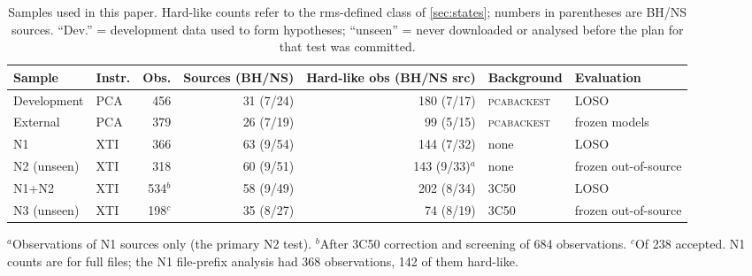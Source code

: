 \documentclass[11pt,a4paper]{article}
\begin{document}
\begin{table}[t]
\centering\small
\caption{Samples used in this paper. Hard-like counts refer to the rms-defined class of \cref{sec:states}; numbers in
parentheses are BH/NS sources. ``Dev.'' = development data used to form hypotheses; ``unseen'' = never downloaded or
analysed before the plan for that test was committed.}\label{tab:samples}
\footnotesize\setlength{\tabcolsep}{4pt}
\begin{tabular}{@{}l l r r r l l@{}}
\toprule
Sample & Instr. & Obs. & Sources (BH/NS) & Hard-like obs (BH/NS src) & Background & Evaluation \\
\midrule
Development & PCA & 456 & 31 (7/24) & 180 (7/17) & \textsc{pcabackest} & LOSO \\
External & PCA & 379 & 26 (7/19) & 99 (5/15) & \textsc{pcabackest} & frozen models \\
N1 & XTI & 366 & 63 (9/54) & 144 (7/32) & none & LOSO \\
N2 (unseen) & XTI & 318 & 60 (9/51) & 143 (9/33)$^{a}$ & none & frozen out-of-source \\
N1+N2 & XTI & 534$^{b}$ & 58 (9/49) & 202 (8/34) & 3C50 & LOSO \\
N3 (unseen) & XTI & 198$^{c}$ & 35 (8/27) & 74 (8/19) & 3C50 & frozen out-of-source \\
\bottomrule
\end{tabular}

\smallskip\raggedright\footnotesize
$^{a}$Observations of N1 sources only (the primary N2 test). $^{b}$After 3C50 correction and screening of 684
observations. $^{c}$Of 238 accepted. N1 counts are for full files; the N1 file-prefix analysis had 368 observations, 142
of them hard-like.
\end{table}
\end{document}
